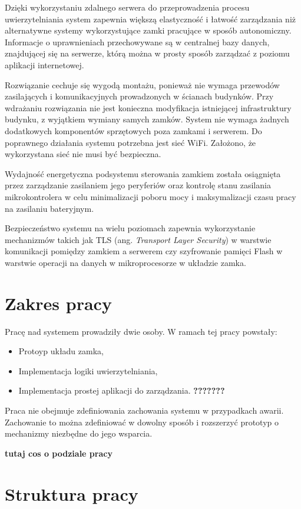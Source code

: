 Dzięki wykorzystaniu zdalnego serwera do przeprowadzenia procesu uwierzytelniania system zapewnia większą elastyczność i łatwość zarządzania niż alternatywne systemy wykorzystujące zamki pracujące w sposób autonomiczny. Informacje o uprawnieniach przechowywane są w centralnej bazy danych, znajdującej się na serwerze, którą można w prosty sposób zarządzać z poziomu aplikacji internetowej.

Rozwiązanie cechuje się wygodą montażu, ponieważ nie wymaga przewodów zasilających i komunikacyjnych prowadzonych w ścianach budynków. Przy wdrażaniu rozwiązania nie jest konieczna modyfikacja istniejącej infrastruktury budynku, z wyjątkiem wymiany samych zamków. System nie wymaga żadnych dodatkowych komponentów sprzętowych poza zamkami i serwerem. Do poprawnego działania systemu potrzebna jest sieć WiFi. Założono, że wykorzystana sieć nie musi być bezpieczna.

Wydajność energetyczna podsystemu sterowania zamkiem została osiągnięta przez zarządzanie zasilaniem jego peryferiów oraz kontrolę stanu zasilania mikrokontrolera w celu minimalizacji poboru mocy i maksymalizacji czasu pracy na zasilaniu bateryjnym.

Bezpieczeństwo systemu na wielu poziomach zapewnia wykorzystanie mechanizmów takich jak TLS (ang. \textit{Transport Layer Security}) w warstwie komunikacji pomiędzy zamkiem a serwerem czy szyfrowanie pamięci Flash w warstwie operacji na danych w mikroprocesorze w układzie zamka.

\section{Zakres pracy}
Pracę nad systemem prowadziły dwie osoby. W ramach tej pracy powstały:
\begin{itemize}
    \item Protoyp układu zamka,
    \item Implementacja logiki uwierzytelniania,
    \item Implementacja prostej aplikacji do zarządzania. \textbf{???????}
\end{itemize}

Praca nie obejmuje zdefiniowania zachowania systemu w przypadkach awarii. Zachowanie to można zdefiniować w dowolny sposób i rozszerzyć prototyp o mechanizmy niezbędne do jego wsparcia.

\textbf{tutaj cos o podziale pracy}

\section{Struktura pracy}

